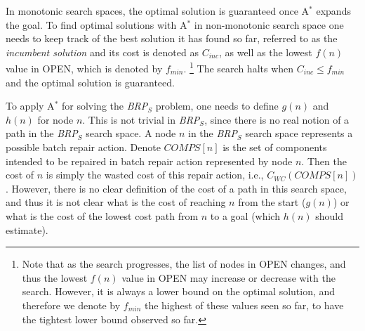 \documentclass[a4paper,11pt]{report}
\newcommand\meir[1]{\textcolor{red}{meir: #1}}
\newcommand{\astar}{A$^*$}
\newcommand{\brps}{\textit{BRP$_S$}}
\newcommand{\comps}{\textit{COMPS}}
\begin{document}
In monotonic search spaces, the optimal solution is guaranteed once \astar{} expands the goal. 
To find optimal solutions with \astar{} in non-monotonic search space one needs to keep track of the best solution it has found so far, referred to as the \emph{incumbent solution} and its cost is denoted as $C_{inc}$, as well as the lowest $f(n)$ value in OPEN, which is denoted by $f_{min}$. 
\footnote{Note that as the search progresses, the list of nodes in OPEN changes, and thus the lowest $f(n)$ value in OPEN may increase or decrease with the search. However, it is always a lower bound on the optimal solution, and therefore we denote by $f_{min}$ the highest of these values seen so far, to have the tightest lower bound observed so far.} 
The search halts when $C_{inc}\leq f_{min}$ and the optimal solution is guaranteed. 

To apply \astar{} for solving the \brps{} problem, one needs to define $g(n)$ and $h(n)$ for node $n$. 
This is not trivial in \brps{}, since there is no real notion of a path in the \brps{} search space. 
A node $n$ in the \brps{} search space represents a possible batch repair action. 
Denote $\comps[n]$ is the set of components intended to be repaired in batch repair action represented by node $n$. Then the cost of $n$ is simply the wasted cost of  this repair action, i.e., $C_{WC}(\comps[n])$. 
However, there is no clear definition of the cost of a path in this search space, and thus it is not clear what is the cost of reaching $n$ from the start ($g(n)$) or what is the cost of the lowest cost path from $n$ to a goal (which $h(n)$ should estimate). 
\end{document}
